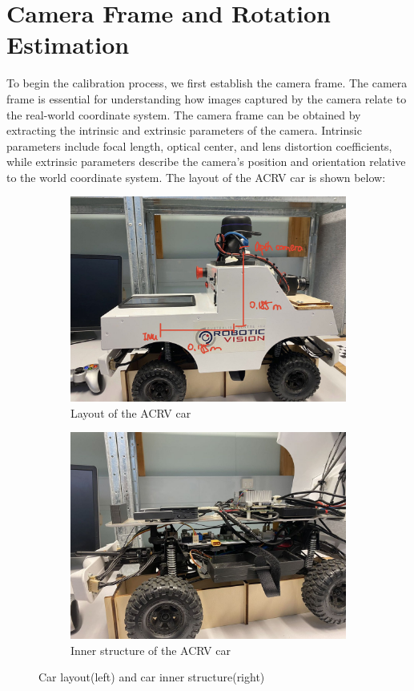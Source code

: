 \documentclass{article}
\begin{document}
\section*{Camera Frame and Rotation Estimation}
To begin the calibration process, we first establish the camera frame. 
The camera frame is essential for understanding 
how images captured by the camera relate to the real-world coordinate system. 
The camera frame can be obtained by extracting the intrinsic and extrinsic parameters of the camera. 
Intrinsic parameters include focal length, optical center, and lens distortion coefficients, 
while extrinsic parameters describe the camera's position and orientation relative to the world coordinate system. The layout 
of the ACRV car is shown below:
\begin{figure}[H]
    \centering
    \begin{subfigure}[b]{0.45\textwidth}
        \includegraphics[width=\textwidth]{newlabel.jpeg}
        \caption{Layout of the ACRV car}
        \label{fig:first_image}
    \end{subfigure}
    \hfill
    \begin{subfigure}[b]{0.45\textwidth}
        \includegraphics[width=\textwidth]{inside.jpeg}
        \caption{Inner structure of the ACRV car}
        \label{fig:second_image}
    \end{subfigure}
    \caption{Car layout(left) and car inner structure(right)}
    \label{fig:both_images}
\end{figure}
\end{document}
